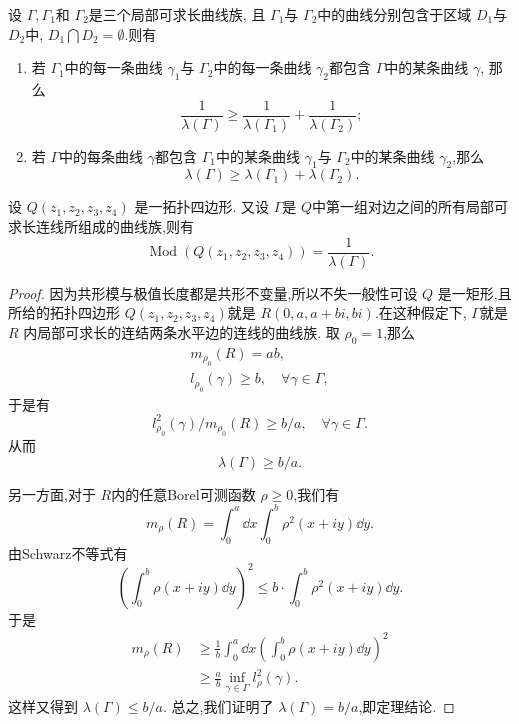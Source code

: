 \begin{theorem}
    设 $\Gamma,\Gamma_1$和 $\Gamma_2$是三个局部可求长曲线族, 且 $\Gamma_1$与 $\Gamma_2$中的曲线分别包含于区域 $D_1$与 $D_2$中, $D_1 \bigcap D_2=\emptyset$.则有
    \begin{enumerate}[label=(\roman*),font=\upshape]
        \item 若 $\Gamma_1$中的每一条曲线 $\gamma_1$与 $\Gamma_2$中的每一条曲线 $\gamma_2$都包含 $\Gamma$中的某条曲线 $\gamma$, 那么
        \[\frac{1}{\lambda (\Gamma)}\geqslant \frac{1}{\lambda (\Gamma_1)}+\frac{1}{\lambda (\Gamma_2)};\]
    \item 若 $\Gamma$中的每条曲线 $\gamma$都包含 $\Gamma_1$中的某条曲线 $\gamma_1$与 $\Gamma_2$中的某条曲线 $\gamma_2$,那么
    \[\lambda (\Gamma)\geqslant\lambda (\Gamma_1)+\lambda (\Gamma_2).\]
    \end{enumerate}
\end{theorem}

\begin{theorem}
    设 $Q(z_1,z_2,z_3,z_4)$ 是一拓扑四边形. 又设 $\Gamma$是 $Q$中第一组对边之间的所有局部可求长连线所组成的曲线族,则有
    \[\operatorname{Mod} (Q(z_1,z_2,z_3,z_4))=\frac{1}{\lambda(\Gamma)}.\]
\end{theorem}
\begin{proof}
    因为共形模与极值长度都是共形不变量,所以不失一般性可设 $Q$ 是一矩形,且所给的拓扑四边形 $Q(z_1,z_2,z_3,z_4)$就是 $R(0,a,a+bi,bi)$.在这种假定下, $\Gamma$就是 $R$ 内局部可求长的连结两条水平边的连线的曲线族. 取 $\rho_0=1$,那么
    \begin{align*}
        m_{\rho_{0}} (R)=ab,\\ 
        l_{\rho_0} (\gamma)\geqslant b,\quad\forall \gamma \in \Gamma,
    \end{align*}
    于是有
    \[l^2_{\rho_0}(\gamma)/m_{\rho_0}(R)\geqslant b/a,\quad\forall \gamma \in \Gamma.\]
    从而 
    \[\lambda(\Gamma)\geqslant b/a.\]
    
    另一方面,对于 $R$内的任意Borel可测函数 $\rho\geqslant 0$,我们有
    \[m_{\rho}(R)=\int_0^a \dd x\int_0^b \rho^2 (x+iy)\dd y.\]
    由Schwarz不等式有
    \[\left( \int_0^b \rho(x+iy)\dd y \right)^2 \leqslant b\cdot \int_0^b \rho^2 (x+iy)\dd y.\]
    于是
    \begin{align*}
        m_{\rho}(R)&\geqslant \frac 1b \int_0^a \dd x \left(\int_0^b \rho (x+iy)\dd y\right)^2\\ 
        &\geqslant\frac ab \inf_{\gamma\in \Gamma}l^2_{\rho}(\gamma). 
    \end{align*}
    这样又得到 $\lambda(\Gamma)\leqslant b/a$.
    总之,我们证明了 $\lambda(\Gamma)=b/a$,即定理结论.
\end{proof}

